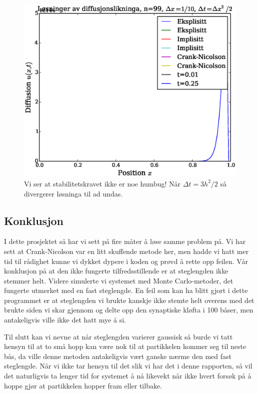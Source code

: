 \documentclass[norsk, 10pt]{article}
\begin{document}
\begin{figure}[H]
\centerline{\includegraphics[scale = 0.5]{oppgave_d_alfa.eps}}
\caption{Vi ser at stabilitetskravet ikke er noe humbug! Når $\Delta t = 3h^2/2$ så divergerer løsninga til ad undas.}
\label{fig:alfa}
\end{figure}
\subsection*{Konklusjon}
I dette prosjektet så har vi sett på fire måter å løse samme problem på. Vi har sett at Crank-Nicolson var en litt skuffende metode her, men hadde vi hatt mer tid til rådighet kunne vi dykket dypere i koden og prøvd å rette opp feilen. Vår konklusjon på at den ikke fungerte tilfredsstillende er at steglengden ikke stemmer helt. Videre simulerte vi systemet med Monte Carlo-metoder, det fungerte utmerket med en fast steglengde. En feil som kan ha blitt gjort i dette programmet er at steglengden vi brukte kanskje ikke stemte helt overens med det \cite{farnell} brukte siden vi skar gjennom og delte opp den synaptiske kløfta i 100 båser, men antakeligvis ville ikke det hatt mye å si.

Til slutt kan vi nevne at når steglengden varierer gaussisk så burde vi tatt hensyn til at to små hopp kan være nok til at partikkelen kommer seg til neste bås, da ville denne metoden antakeligvis vært ganske nærme den med fast steglengde. Når vi ikke tar hensyn til det slik vi har det i denne rapporten, så vil det naturligvis ta lenger tid for systemet å nå likevekt når ikke hvert forsøk på å hoppe gjør at partikkelen hopper fram eller tilbake.
\end{document}
